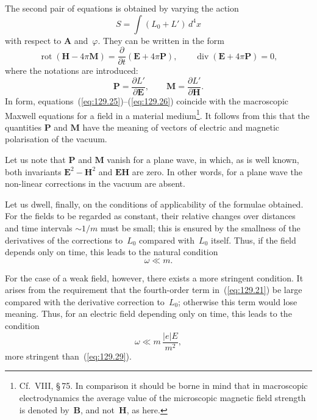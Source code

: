 The second pair of equations is obtained by varying the action
\[
S = \int(L_0 + L')\,d^4x
\]
with respect to $\mathbf{A}$ and~$\varphi$. They can be written in the form
\begin{equation}
\operatorname{rot}(\mathbf{H}-4\pi\mathbf{M}) = \frac{\partial}{\partial t}(\mathbf{E}+4\pi\mathbf{P}),\qquad \operatorname{div}(\mathbf{E}+4\pi\mathbf{P}) = 0,
\label{eq:129.26}
\end{equation}
\begin{equation}
\label{eq:129.27}
\end{equation}
where the notations are introduced:
\begin{equation}
\mathbf{P} = \frac{\partial L'}{\partial\mathbf{E}},\qquad \mathbf{M} = \frac{\partial L'}{\partial\mathbf{H}}.
\label{eq:129.28}
\end{equation}
In form, equations~(\ref{eq:129.25})--(\ref{eq:129.26}) coincide with the macroscopic Maxwell equations for a field in a material medium\footnote{Cf.\ VIII, \S\,75. In comparison it should be borne in mind that in macroscopic electrodynamics the average value of the microscopic magnetic field strength is denoted by~$\mathbf{B}$, and not~$\mathbf{H}$, as here.}. It follows from this that the quantities $\mathbf{P}$ and $\mathbf{M}$ have the meaning of vectors of electric and magnetic polarisation of the vacuum.

Let us note that $\mathbf{P}$ and $\mathbf{M}$ vanish for a plane wave, in which, as is well known, both invariants $\mathbf{E}^2-\mathbf{H}^2$ and $\mathbf{E}\mathbf{H}$ are zero. In other words, for a plane wave the non-linear corrections in the vacuum are absent.

Let us dwell, finally, on the conditions of applicability of the formulae obtained. For the fields to be regarded as constant, their relative changes over distances and time intervals $\sim 1/m$ must be small; this is ensured by the smallness of the derivatives of the corrections to~$L_0$ compared with~$L_0$ itself. Thus, if the field depends only on time, this leads to the natural condition
\begin{equation}
\omega \ll m.
\label{eq:129.29}
\end{equation}

For the case of a weak field, however, there exists a more stringent condition. It arises from the requirement that the fourth-order term in~(\ref{eq:129.21}) be large compared with the derivative correction to~$L_0$; otherwise this term would lose meaning. Thus, for an electric field depending only on time, this leads to the condition
\begin{equation}
\omega \ll m\,\frac{|e|E}{m^2},
\label{eq:129.30}
\end{equation}
more stringent than~(\ref{eq:129.29}).

